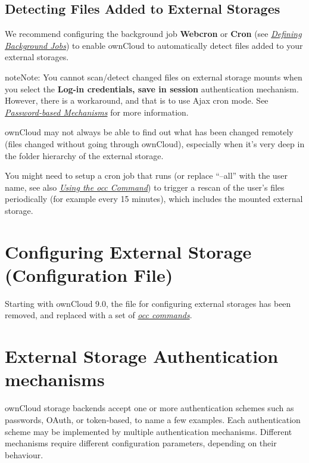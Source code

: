 \documentclass[letterpaper,10pt,english]{sphinxmanual}
\begin{document}
\subsection{Detecting Files Added to External Storages}
\label{configuration_files/external_storage_configuration_gui:detecting-files-added-to-external-storages}
We recommend configuring the background job \textbf{Webcron} or
\textbf{Cron} (see {\hyperref[configuration_server/background_jobs_configuration::doc]{\emph{Defining Background Jobs}}})
to enable ownCloud to automatically detect files added to your external
storages.

\begin{notice}{note}{Note:}
You cannot scan/detect changed files on external storage mounts when you select
the \textbf{Log-in credentials, save in session} authentication mechanism. However, there is
a workaround, and that is to use Ajax cron mode. See {\hyperref[configuration_files/external_storage/auth_mechanisms:password-auth-workaround-label]{\emph{Password-based Mechanisms}}}
for more information.
\end{notice}

ownCloud may not always be able to find out what has been
changed remotely (files changed without going through ownCloud), especially
when it's very deep in the folder hierarchy of the external storage.

You might need to setup a cron job that runs 
(or replace ``--all'' with the user name, see also {\hyperref[configuration_server/occ_command::doc]{\emph{Using the occ Command}}})
to trigger a rescan of the user's files periodically (for example every 15 minutes), which includes
the mounted external storage.


\section{Configuring External Storage (Configuration File)}
\label{configuration_files/external_storage_configuration:configuring-external-storage-configuration-file}\label{configuration_files/external_storage_configuration::doc}
Starting with ownCloud 9.0, the  file for configuring
external storages has been removed, and replaced with a set of
{\hyperref[configuration_server/occ_command:files-external-label]{\emph{occ commands}}}.


\section{External Storage Authentication mechanisms}
\label{configuration_files/external_storage/auth_mechanisms:external-storage-authentication-mechanisms}\label{configuration_files/external_storage/auth_mechanisms::doc}
ownCloud storage backends accept one or more authentication schemes such as
passwords, OAuth, or token-based, to name a few examples. Each authentication
scheme may be implemented by multiple authentication mechanisms. Different
mechanisms require different configuration parameters, depending on their
behaviour.
\end{document}
